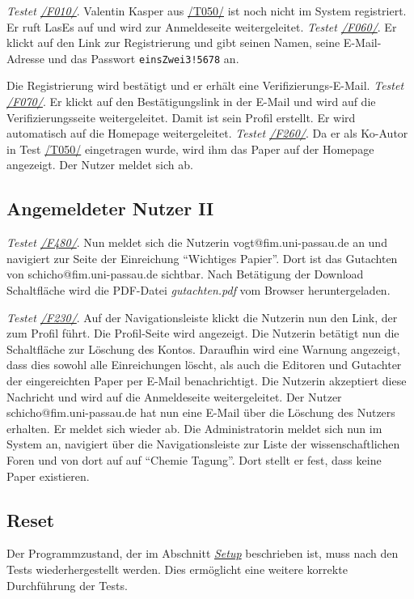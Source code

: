 \begin{description}
	 \emph{Testet \hyperref[funkt:010]{/F010/}}. Valentin Kasper aus \hyperref[t050]{/T050/} ist noch nicht im System registriert.
	Er ruft LasEs auf und wird zur Anmeldeseite weitergeleitet.
	 \emph{Testet \hyperref[funkt:060]{/F060/}}. Er klickt auf den Link zur Registrierung und gibt seinen Namen, seine E-Mail-Adresse und das Passwort \texttt{einsZwei3!5678} an.

	Die Registrierung wird bestätigt und er erhält eine Verifizierungs-E-Mail.
	 \emph{Testet \hyperref[funkt:070]{/F070/}}. Er klickt auf den Bestätigungslink in der E-Mail und wird auf die Verifizierungsseite weitergeleitet.
	Damit ist sein Profil erstellt.
	Er wird automatisch auf die Homepage weitergeleitet.
	 \emph{Testet \hyperref[funkt:260]{/F260/}}. Da er als Ko-Autor in Test \hyperref[t050]{/T050/} eingetragen wurde, wird ihm das Paper auf der Homepage angezeigt. Der Nutzer meldet sich ab.
\end{description}

\subsection{Angemeldeter Nutzer II}

\begin{description}

	 \emph{Testet \hyperref[funkt:480]{/F480/}}.
	Nun meldet sich die Nutzerin vogt@fim.uni-passau.de an und navigiert zur Seite der Einreichung ``Wichtiges Papier''.
	Dort ist das Gutachten von schicho@fim.uni-passau.de sichtbar.
	Nach Betätigung der Download Schaltfläche wird die PDF-Datei \emph{gutachten.pdf} vom Browser heruntergeladen.

	 \emph{Testet \hyperref[funkt:230]{/F230/}}.
	Auf der Navigationsleiste klickt die Nutzerin nun den Link, der zum Profil führt.
	Die Profil-Seite wird angezeigt.
	Die Nutzerin betätigt nun die Schaltfläche zur Löschung des Kontos.
	Daraufhin wird eine Warnung angezeigt, dass dies sowohl alle Einreichungen löscht, als auch die Editoren und Gutachter der eingereichten Paper per E-Mail benachrichtigt.
	Die Nutzerin akzeptiert diese Nachricht und wird auf die Anmeldeseite weitergeleitet.
	Der Nutzer schicho@fim.uni-passau.de hat nun eine E-Mail über die Löschung des Nutzers erhalten.
	Er meldet sich wieder ab.
	Die Administratorin meldet sich nun im System an, navigiert über die Navigationsleiste zur Liste der wissenschaftlichen Foren und von dort auf auf ``Chemie Tagung''. Dort stellt er fest, dass keine Paper existieren.

\end{description}

\subsection{Reset}
Der Programmzustand, der im Abschnitt \emph{\hyperref[setup]{Setup}} beschrieben ist, muss nach den Tests wiederhergestellt werden.
Dies ermöglicht eine weitere korrekte Durchführung der Tests.



